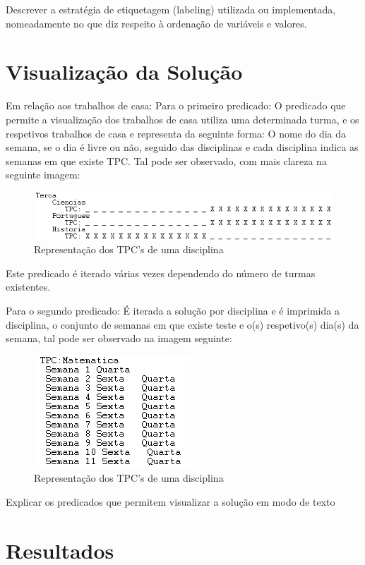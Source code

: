 \documentclass{llncs}
\begin{document}
Descrever a estratégia de etiquetagem
(labeling) utilizada ou implementada, nomeadamente no que diz respeito à ordenação
de variáveis e valores.

\section{Visualização da Solução}
Em relação aos trabalhos de casa:
Para o primeiro predicado:
O predicado que permite a visualização dos trabalhos de casa utiliza uma determinada turma, e os respetivos trabalhos de casa e representa da seguinte forma:
O nome do dia da semana, se o dia é livre ou não, seguido das disciplinas e cada disciplina indica as semanas em que existe TPC. Tal pode ser observado, com mais clareza na seguinte imagem:

\begin{figure}
\centering
\includegraphics[width=1\textwidth]{tpc1}
\caption{Representação dos TPC's de uma disciplina}
\end{figure}

Este predicado é iterado várias vezes dependendo do número de turmas existentes.

Para o segundo predicado:
É iterada a solução por disciplina e é imprimida a disciplina, o conjunto de semanas em que existe teste e o(s) respetivo(s) dia(s) da semana, tal pode ser observado na imagem seguinte:
\begin{figure}
\centering
\includegraphics[]{tpc2}
\caption{Representação dos TPC's de uma disciplina}
\end{figure}

Explicar os predicados que permitem visualizar a solução em modo de texto

\section{Resultados}
\end{document}
